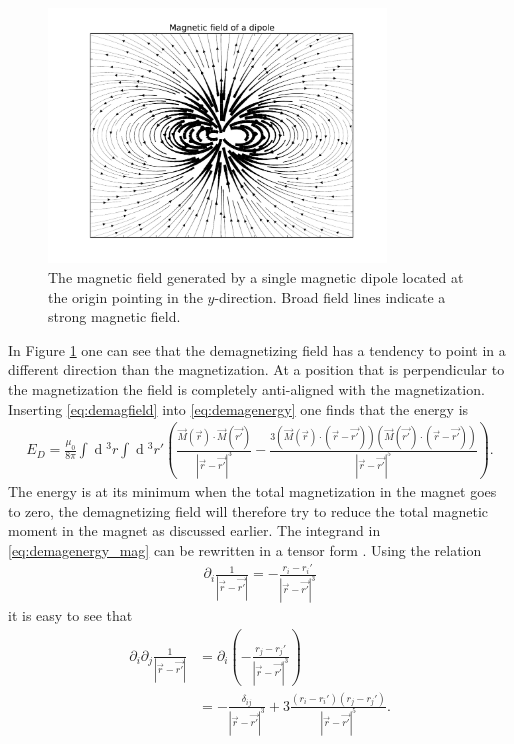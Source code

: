 \documentclass[12pt, a4paper]{article}		%
\renewcommand{\d}[1]{\ensuremath{\operatorname{d}\!{#1}}}
\numberwithin{equation}{section}
\begin{document}
\begin{figure}[h!]
\begin{center}
\includegraphics[width=0.8\textwidth]{Figures/dipole_field.pdf} 
\caption{The magnetic field generated by a single magnetic dipole located at the origin pointing in the $y$-direction. Broad field lines indicate a strong magnetic field.}
\label{fig:dipole_field} 
\end{center}
\end{figure}
In Figure \ref{fig:dipole_field} one can see that the demagnetizing field has a tendency to point in a different direction than the magnetization. At a position that is perpendicular to the magnetization the field is completely anti-aligned with the magnetization. Inserting \eqref{eq:demagfield} into \eqref{eq:demagenergy} one finds that the energy is
\begin{align}
\label{eq:demagenergy_mag}
E_D = \frac{\mu_0}{8\pi} \int \d {^3}r \int \d {^3}r' (\frac{\vec{M} (\vec{r}) \cdot \vec{M} (\vec{r'})}{|\vec{r}-\vec{r'}|^3} - \frac{3(\vec{M}(\vec{r}) \cdot (\vec{r}-\vec{r'})) (\vec{M}(\vec{r'}) \cdot(\vec{r}-\vec{r'}))}{|\vec{r}-\vec{r'}|^5}).
\end{align}
The energy is at its minimum when the total magnetization in the magnet goes to zero, the demagnetizing field will therefore try to reduce the total magnetic moment in the magnet as discussed earlier. 
The integrand in \eqref{eq:demagenergy_mag} can be rewritten in a tensor form \cite{kruger2006current}. Using the relation
\begin{align}
\partial_i \frac{1}{|\vec{r}-\vec{r'}|} = -\frac{r_i-r_i'}{|\vec{r}-\vec{r'}|^3}
\end{align}
it is easy to see that
\begin{align*}
\partial_i\partial_j \frac{1}{|\vec{r}-\vec{r'}|} &= \partial_i(-\frac{r_j-r_j'}{|\vec{r}-\vec{r'}|^3}) \\
&= -\frac{\delta_{ij}}{|\vec{r}-\vec{r'}|^3}+3\frac{(r_i-r_i')(r_j-r_j')}{|\vec{r}-\vec{r'}|^5}.
\end{align*}
\end{document}

